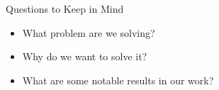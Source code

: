 \begin{frame}{Questions to Keep in Mind}

\begin{itemize}
\item <+-> What problem are we solving?
\item <+-> Why do we want to solve it?
\item <+-> What are some notable results in our work?
\end{itemize}

\end{frame}




